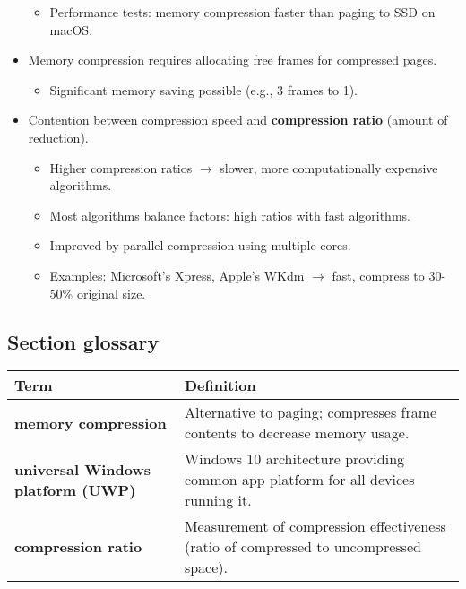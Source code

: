 \begin{itemize}
\begin{itemize}
        \item Performance tests: memory compression faster than paging to SSD on macOS.
    \end{itemize}
    \item Memory compression requires allocating free frames for compressed pages.
    \begin{itemize}
        \item Significant memory saving possible (e.g., 3 frames to 1).
    \end{itemize}
    \item Contention between compression speed and \textbf{compression ratio} (amount of reduction).
    \begin{itemize}
        \item Higher compression ratios $\rightarrow$ slower, more computationally expensive algorithms.
        \item Most algorithms balance factors: high ratios with fast algorithms.
        \item Improved by parallel compression using multiple cores.
        \item Examples: Microsoft's Xpress, Apple's WKdm $\rightarrow$ fast, compress to 30-50\% original size.
    \end{itemize}
\end{itemize}

\vspace{1em}
\subsection*{Section glossary}
\begin{tabular}{p{}p{}}
    \toprule
    \rowcolor{gray!20} \textbf{Term} & \textbf{Definition} \\
    \midrule
    \textbf{memory compression} & Alternative to paging; compresses frame contents to decrease memory usage. \\
    \textbf{universal Windows platform (UWP)} & Windows 10 architecture providing common app platform for all devices running it. \\
    \textbf{compression ratio} & Measurement of compression effectiveness (ratio of compressed to uncompressed space). \\
    \bottomrule
\end{tabular}
